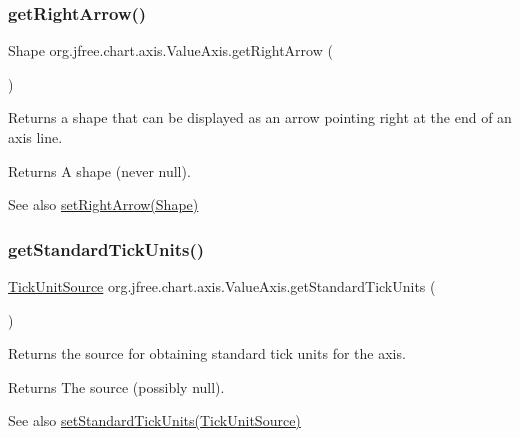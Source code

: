 \subsubsection{\texorpdfstring{get\+Right\+Arrow()}{getRightArrow()}}
{\footnotesize\ttfamily Shape org.\+jfree.\+chart.\+axis.\+Value\+Axis.\+get\+Right\+Arrow (\begin{DoxyParamCaption}{ }\end{DoxyParamCaption})}

Returns a shape that can be displayed as an arrow pointing right at the end of an axis line.

\begin{DoxyReturn}{Returns}
A shape (never {\ttfamily null}).
\end{DoxyReturn}
\begin{DoxySeeAlso}{See also}
\mbox{\hyperlink{classorg_1_1jfree_1_1chart_1_1axis_1_1_value_axis_a8d44ab4ca98d13a775770b10de454825}{set\+Right\+Arrow(\+Shape)}} 
\end{DoxySeeAlso}
\mbox{\label{classorg_1_1jfree_1_1chart_1_1axis_1_1_value_axis_afe89ca3b6b4503e8f97ec9173d1f49f7}} 
\subsubsection{\texorpdfstring{get\+Standard\+Tick\+Units()}{getStandardTickUnits()}}
{\footnotesize\ttfamily \mbox{\hyperlink{interfaceorg_1_1jfree_1_1chart_1_1axis_1_1_tick_unit_source}{Tick\+Unit\+Source}} org.\+jfree.\+chart.\+axis.\+Value\+Axis.\+get\+Standard\+Tick\+Units (\begin{DoxyParamCaption}{ }\end{DoxyParamCaption})}

Returns the source for obtaining standard tick units for the axis.

\begin{DoxyReturn}{Returns}
The source (possibly {\ttfamily null}).
\end{DoxyReturn}
\begin{DoxySeeAlso}{See also}
\mbox{\hyperlink{classorg_1_1jfree_1_1chart_1_1axis_1_1_value_axis_ac84e1ffa28cdea7b355306ae472d21a2}{set\+Standard\+Tick\+Units(\+Tick\+Unit\+Source)}} 
\end{DoxySeeAlso}
\mbox{\label{classorg_1_1jfree_1_1chart_1_1axis_1_1_value_axis_adfbdda5b0016c6d1f8d238979f3ab1a1}} 
